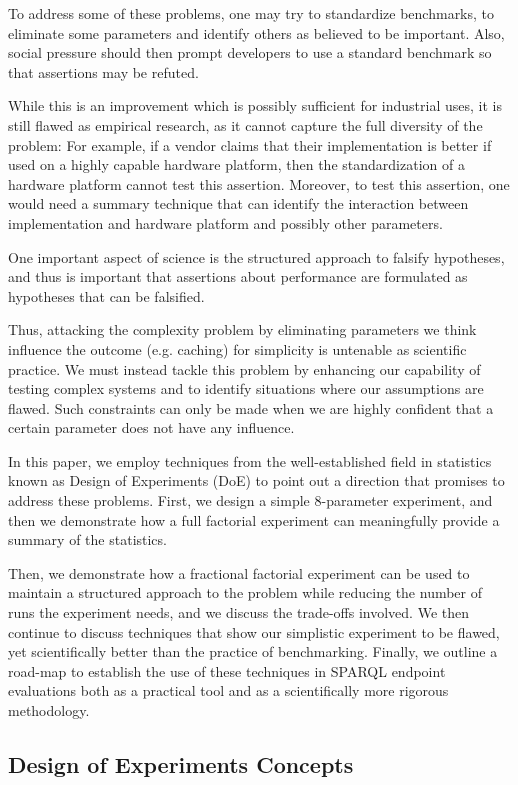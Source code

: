 \documentclass{llncs}
\begin{document}
To address some of these problems, one may try to standardize
benchmarks, to eliminate some parameters and identify others as
believed to be important. Also, social pressure should then prompt
developers to use a standard benchmark so that assertions may be
refuted.

While this is an improvement which is possibly sufficient for
industrial uses, it is still flawed as empirical research, as it
cannot capture the full diversity of the problem: For example, if a
vendor claims that their implementation is better if used on a highly
capable hardware platform, then the standardization of a hardware
platform cannot test this assertion. Moreover, to test this assertion,
one would need a summary technique that can identify the interaction
between implementation and hardware platform and possibly other
parameters.

One important aspect of science is the structured approach to falsify
hypotheses, and thus is important that assertions about performance
are formulated as hypotheses that can be falsified.

Thus, attacking the complexity problem by eliminating parameters we
think influence the outcome (e.g. caching) for simplicity is untenable
as scientific practice. We must instead tackle this problem by
enhancing our capability of testing complex systems and to identify
situations where our assumptions are flawed. Such constraints can only
be made when we are highly confident that a certain parameter does not
have any influence.

In this paper, we employ techniques from the well-established field in
statistics known as Design of Experiments (DoE) to point out a
direction that promises to address these problems. First, we design a
simple 8-parameter experiment, and then we demonstrate how a full
factorial experiment can meaningfully provide a summary of the
statistics.

Then, we demonstrate how a fractional factorial experiment can be used
to maintain a structured approach to the problem while reducing the
number of runs the experiment needs, and we discuss the trade-offs
involved. We then continue to discuss techniques that show our
simplistic experiment to be flawed, yet scientifically better than the
practice of benchmarking. Finally, we outline a road-map to establish
the use of these techniques in SPARQL endpoint evaluations both as a
practical tool and as a scientifically more rigorous methodology.

\subsection{Design of Experiments Concepts}
\end{document}
